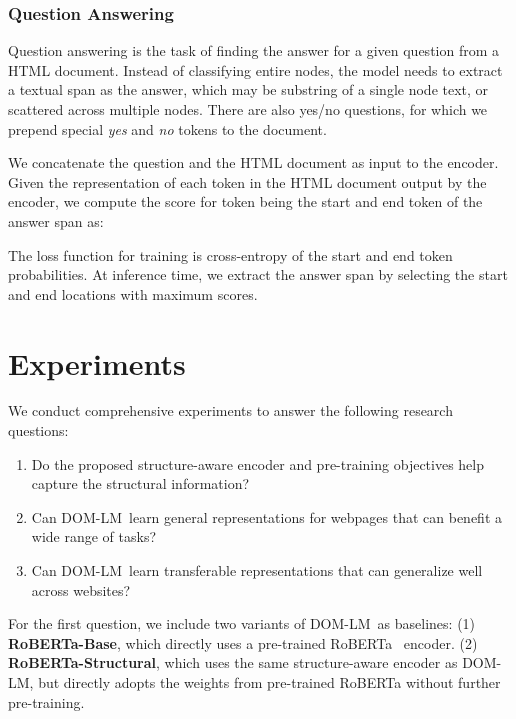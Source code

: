 \documentclass[sigconf, nonacm]{acmart}
\newcommand{\ours}[0]{DOM-LM}
\newcommand{\nop}[1]{}
\begin{document}
\subsubsection{Question Answering}
Question answering is the task of finding the answer for a given question from a HTML document. Instead of classifying entire nodes, the model needs to extract a textual span as the answer, which may be substring of a single node text, or scattered across multiple nodes. There are also yes/no questions, for which we prepend special \textit{yes} and \textit{no} tokens to the document. 

We concatenate the question and the HTML document as input to the encoder. Given the representation of each token in the HTML document  output by the encoder, we compute the score for token  being the start and end token of the answer span as:

The loss function for training is cross-entropy of the start and end token probabilities. At inference time, we extract the answer span by selecting the start and end locations with maximum scores. \section{Experiments}
We conduct comprehensive experiments to answer the following research questions:

\begin{enumerate}
	\item Do the proposed structure-aware encoder and pre-training objectives help capture the structural information?
	\item Can \ours\ learn general representations for webpages that can benefit a wide range of tasks?
	\item Can \ours\ learn transferable representations that can generalize well across websites? \nop{For RQ3, it seems hard to link the claim of handling noisy real-world data to the experiment. Readers may not be aware that Demeter data is noisy and there is no experiments artificially add noise into the data.}
\end{enumerate}\nop{Briefly say how you plan to answer these RQs in the coming subsections.}
For the first question, we include two variants of \ours\ as baselines:\nop{should we briefly say why they make good baselines?} (1) \textbf{RoBERTa-Base}, which directly uses a pre-trained RoBERTa~\cite{liu2019roberta} encoder. (2) \textbf{RoBERTa-Structural}, which uses the same structure-aware encoder as \ours, but directly adopts the weights from pre-trained RoBERTa without further pre-training. 
\end{document}
